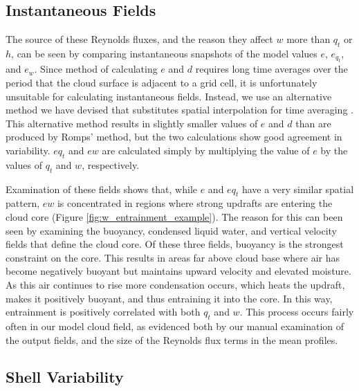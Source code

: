 \documentclass[draft,grl]{agutex}
\begin{document}
\begin{article}

\subsection{Instantaneous Fields}

The source of these Reynolds fluxes, and the reason they affect $w$ more than 
$q_t$ or $h$, can be seen by comparing instantaneous snapshots of the model 
values $e$, $e_{q_t}$, and $e_w$.  Since \cite{Romps2010} method of calculating 
$e$ and $d$ requires long time averages over the period that the cloud surface
is adjacent to a grid cell, it is unfortunately unsuitable for calculating 
instantaneous fields.  Instead, we use an alternative method we have devised 
that substitutes spatial interpolation for time averaging \citep{Dawe2011}.  
This alternative method results in slightly smaller values of $e$ and $d$ than 
are produced by Romps' method, but the two calculations show good agreement in 
variability. $eq_t$ and $ew$ are calculated simply by multiplying the value 
of $e$ by the values of $q_t$ and $w$, respectively.

Examination of these fields shows that, while $e$ and $eq_t$ have a very 
similar spatial pattern, $ew$ is concentrated in regions where strong updrafts 
are entering the cloud core (Figure \ref{fig:w_entrainment_example}).  The 
reason for this can been seen by examining the buoyancy, condensed liquid water,
and vertical velocity fields that define the cloud core.  Of these three
fields, buoyancy is the strongest constraint on the core.  This results in 
areas far above cloud base where air has become negatively buoyant but 
maintains upward velocity and elevated moisture.  As this air continues to 
rise more condensation occurs, which heats the updraft, makes it positively 
buoyant, and thus entraining it into the core.  In this way, entrainment is 
positively correlated with both $q_t$ and $w$.  This process occurs fairly 
often in our model cloud field, as evidenced both by our manual examination of 
the output fields, and the size of the Reynolds flux terms in the mean 
profiles.


\subsection{Shell Variability}


\end{article}
\end{document}
